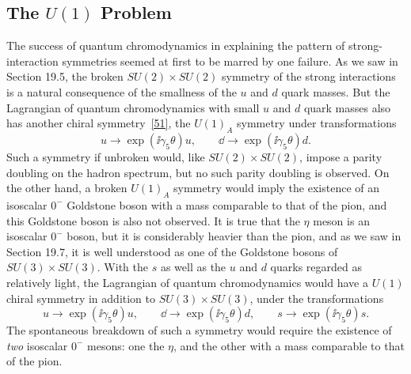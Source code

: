 \subsection{\texorpdfstring{The $U(1)$ Problem}{The U(1) Problem}}
\label{sec:19.10}

The success of quantum chromodynamics in explaining the pattern of strong-interaction symmetries seemed at first to be marred by one failure. As we saw in Section 19.5, the broken $SU(2)\times SU(2)$ symmetry of the strong interactions is a natural consequence of the smallness of the $u$ and $d$ quark masses. But the Lagrangian of quantum chromodynamics with small $u$ and $d$ quark masses also has another chiral symmetry~\hyperref[ch19-ref-51]{[51]}, the $U(1)_A$ symmetry under transformations
\begin{equation}
u\longrightarrow\exp(\ii\gamma_5\theta)u,
\qquad
\dd\longrightarrow\exp(\ii\gamma_5\theta)d.
\tag{19.10.1}\label{eq:19.10.1}
\end{equation}
Such a symmetry if unbroken would, like $SU(2)\times SU(2)$, impose a parity doubling on the hadron spectrum, but no such parity doubling is observed. On the other hand, a broken $U(1)_A$ symmetry would imply the existence of an isoscalar $0^-$ Goldstone boson with a mass comparable to that of the pion, and this Goldstone boson is also not observed. It is true that the $\eta$ meson is an isoscalar $0^-$ boson, but it is considerably heavier than the pion, and as we saw in Section 19.7, it is well understood as one of the Goldstone bosons of $SU(3)\times SU(3)$. With the $s$ as well as the $u$ and $d$ quarks regarded as relatively light, the Lagrangian of quantum chromodynamics would have a $U(1)$ chiral symmetry in addition to $SU(3)\times SU(3)$, under the transformations
\begin{equation}
u\longrightarrow\exp(\ii\gamma_5\theta)u,
\qquad
\dd\longrightarrow\exp(\ii\gamma_5\theta)d,
\qquad
s\longrightarrow\exp(\ii\gamma_5\theta)s.
\tag{19.10.2}\label{eq:19.10.2}
\end{equation}
The spontaneous breakdown of such a symmetry would require the existence of \emph{two} isoscalar $0^-$ mesons: one the $\eta$, and the other with a mass comparable to that of the pion.

